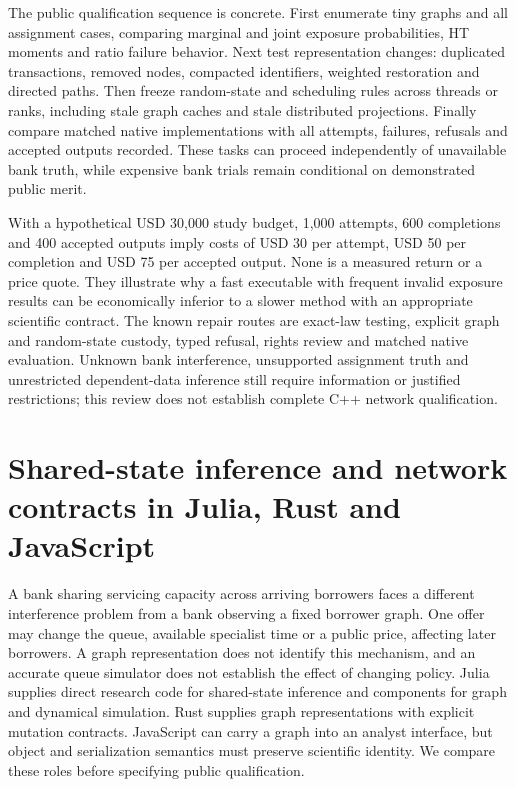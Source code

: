 The public qualification sequence is concrete. First enumerate tiny graphs and all assignment cases, comparing marginal and joint exposure probabilities, HT moments and ratio failure behavior. Next test representation changes: duplicated transactions, removed nodes, compacted identifiers, weighted restoration and directed paths. Then freeze random-state and scheduling rules across threads or ranks, including stale graph caches and stale distributed projections. Finally compare matched native implementations with all attempts, failures, refusals and accepted outputs recorded. These tasks can proceed independently of unavailable bank truth, while expensive bank trials remain conditional on demonstrated public merit.~\citep{exec25_cnet_choice}

With a hypothetical USD 30,000 study budget, 1,000 attempts, 600 completions and 400 accepted outputs imply costs of USD 30 per attempt, USD 50 per completion and USD 75 per accepted output. None is a measured return or a price quote. They illustrate why a fast executable with frequent invalid exposure results can be economically inferior to a slower method with an appropriate scientific contract. The known repair routes are exact-law testing, explicit graph and random-state custody, typed refusal, rights review and matched native evaluation. Unknown bank interference, unsupported assignment truth and unrestricted dependent-data inference still require information or justified restrictions; this review does not establish complete C++ network qualification.~\citep{exec25_cnet_choice}


\section[Shared-state and remaining-language networks]{Shared-state inference and network contracts in Julia, Rust and JavaScript}
\label{sec:exec25-onet}

A bank sharing servicing capacity across arriving borrowers faces a different
interference problem from a bank observing a fixed borrower graph. One offer
may change the queue, available specialist time or a public price, affecting
later borrowers. A graph representation does not identify this mechanism, and
an accurate queue simulator does not establish the effect of changing policy.
Julia supplies direct research code for shared-state inference and components
for graph and dynamical simulation. Rust supplies graph representations with
explicit mutation contracts. JavaScript can carry a graph into an analyst
interface, but object and serialization semantics must preserve scientific
identity. We compare these roles before specifying public qualification.

